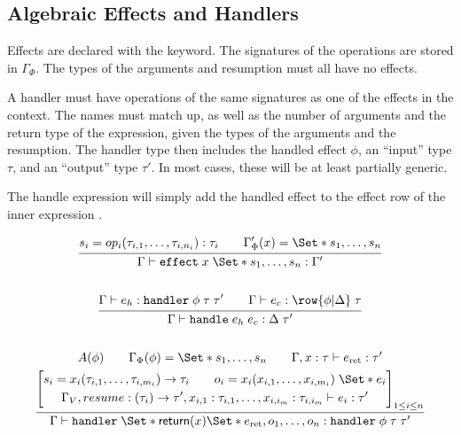 \subsection{Algebraic Effects and Handlers}\label{ssec:spechandler}
Effects are declared with the  keyword. The signatures of the operations are stored in $\Gamma_\Phi$. The types of the arguments and resumption must all have no effects.

A handler must have operations of the same signatures as one of the effects in the context. The names must match up, as well as the number of arguments and the return type of the expression, given the types of the arguments and the resumption. The handler type then includes the handled effect $\phi$, an ``input'' type $\tau$, and an ``output'' type $\tau'$. In most cases, these will be at least partially generic.

The handle expression will simply add the handled effect to the effect row of the inner expression .

\begin{gather*}
    \infer{
        \Gamma \vdash \kw{effect}\;x\;\S{s_1, \dots, s_n}: \Gamma'
    }{
        s_i = op_i(\tau_{i,1},\dots, \tau_{i,n_i}): \tau_i
        \qquad
        \Gamma'_\Phi(x) = \S{s_1, \dots, s_n}
    }
    \\\\
    \infer{
        \Gamma \vdash \handle\;e_h\;e_c : \Delta\;\tau'
    }{
        \Gamma \vdash e_h : \handler\;\phi\;\tau\;\tau'
        \qquad
        \Gamma \vdash e_c : \row{\phi | \Delta}\;\tau
    }
    \\\\
    \infer{
        \Gamma \vdash \handler\;\S{ \return(x) \S{ e_{\text{ret}} }, o_1, \dots, o_n }
        : \handler\;\phi\;\tau\;\tau'
    }{
        A(\phi)
        \qquad
        \Gamma_\Phi(\phi) = \S{ s_1, \dots, s_n }
        \qquad
        \Gamma, x: \tau \vdash e_{\text{ret}} : \tau' 
        \\
        \left[
            \begin{gathered}
                s_i = x_i(\tau_{i,1}, \dots, \tau_{i,m_i}) \to \tau_i
                \qquad
                o_i = x_i(x_{i,1}, \dots, x_{i,m_i})\;\S{ e_i }
                \\
                \Gamma_V, resume : (\tau_i) \to \tau', x_{i,1}: \tau_{i,1}, \dots, x_{i,i_m}: \tau_{i,i_m} 
                \vdash e_i: \tau'
            \end{gathered}
        \right]_{1\leq i\leq n}
    }
\end{gather*}

